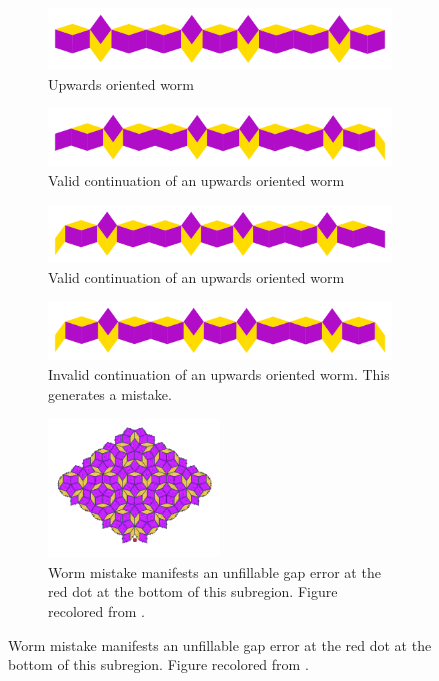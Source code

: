 \documentclass[
  oneside,
  11pt, a4paper,
  footinclude=true,
  headinclude=true,
  cleardoublepage=empty
]{scrbook}
\begin{document}
\begin{figure}[H]
\centering
\begin{subfigure}{\textwidth}
\centering
\includegraphics[width=\textwidth]{reValidWorm0}
\caption{Upwards oriented worm}
\end{subfigure}

\begin{subfigure}{\textwidth}
\centering
\includegraphics[width=\textwidth]{reValidWorm1}
\caption{Valid continuation of an upwards oriented worm}
\end{subfigure}

\begin{subfigure}{\textwidth}
\centering
\includegraphics[width=\textwidth]{reValidWorm2}
\caption{Valid continuation of an upwards oriented worm}
\end{subfigure}

\begin{subfigure}{\textwidth}
\centering
\includegraphics[width=\textwidth]{reInvalidWorm}
\caption{Invalid continuation of an upwards oriented worm. This generates a mistake.}
\end{subfigure}

\begin{subfigure}{\textwidth}
\centering
\includegraphics[width=0.5\textwidth]{illegal}
\caption{Worm mistake manifests an unfillable gap error at the red dot at the bottom of this subregion. Figure recolored from \cite{Austin2007}.}
\end{subfigure}


\end{figure}
\end{document}
